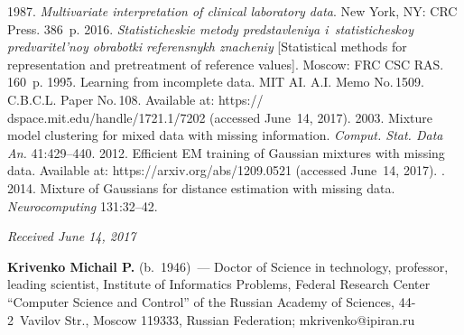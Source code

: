 \begin{multicols}{2}
{{\begin{thebibliography}{99}
 1987. \textit{Multivariate interpretation of clinical laboratory data}. 
New York, NY: CRC Press. 386~p.
 2016. \textit{Statisticheskie metody predstavleniya 
i~statisticheskoy predvaritel'noy obrabotki referensnykh znacheniy} [Statistical 
methods for representation and pretreatment of reference values]. Moscow: FRC CSC RAS. 
160~p.
 1995. Learning from incomplete data. 
MIT AI. A.I. Memo No.\,1509. C.B.C.L. Paper No.\,108. Available 
at: {\sf https:// dspace.mit.edu/handle/1721.1/7202} (accessed June~14, 2017).
 2003. Mixture model clustering for mixed data 
with missing information. \textit{Comput. Stat. Data An.} 41:429--440.
 2012. Efficient EM training of 
Gaussian mixtures with missing data. Available at: {\sf 
https://arxiv.org/abs/1209.0521} (accessed June~14, 2017).
. 2014. Mixture 
of Gaussians for distance estimation with missing data. \textit{Neurocomputing} 
131:32--42.
\end{thebibliography}

 }
 }

\end{multicols}

\vspace*{-6pt}

\hfill{\small\textit{Received June 14, 2017}}

\vspace*{-18pt}

\Contrl

\noindent
\textbf{Krivenko Michail P.} (b.\ 1946)~--- Doctor of Science in technology, 
professor, leading scientist, Institute of Informatics Problems, Federal Research 
Center ``Computer Science and Control'' of the Russian Academy of Sciences,  
44-2~Vavilov Str., Moscow 119333, Russian Federation; 
\mbox{mkrivenko@ipiran.ru}


\label{end\stat}


\renewcommand{\bibname}{\protect\rm Литература} 